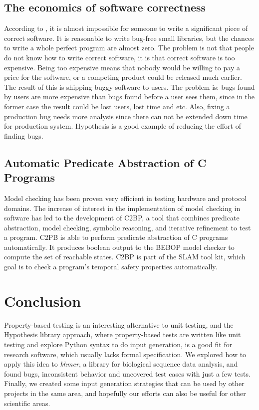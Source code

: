 \documentclass[preprint,nocopyrightspace]{sig-alternate}
\begin{document}
\subsection{The economics of software correctness}
According to \citet{maciver_economics_2015},
it is almost impossible for someone to write a significant piece of correct software.
It is reasonable to write bug-free small libraries,
but the chances to write a whole perfect program are almost zero.
The problem is not that people do not know how to write correct software,
it is that correct software is too expensive.
Being too expensive means that nobody would be willing to pay a price for the software,
or a competing product could be released much earlier.
The result of this is shipping buggy software to users.
The problem is:
bugs found by users are more expensive than bugs found before a user sees them,
since in the former case the result could be lost users, lost time and etc.
Also, fixing a production bug needs more analysis since
there can not be extended down time for production system.
Hypothesis is a good example of reducing the effort of finding bugs.

\subsection{Automatic Predicate Abstraction of C Programs}
Model checking has been proven very efficient in testing hardware and protocol domains. \citet{model_checking}
The increase of interest in the implementation of model checking in software has led to the development of C2BP,
a tool that combines predicate abstraction, model checking, symbolic reasoning, and iterative refinement to test a program.
C2PB is able to perform predicate abstraction of C programs automatically.
It produces boolean output to the BEBOP model checker to compute the set of reachable states.
C2BP is part of the SLAM tool kit, which goal is to check a program’s temporal safety properties automatically.

\section{Conclusion}

Property-based testing is an interesting alternative to unit testing,
and the Hypothesis library approach,
where property-based tests are written like unit testing and explore Python syntax to do input generation,
is a good fit for research software,
which usually lacks formal specification.
We explored how to apply this idea to \emph{khmer},
a library for biological sequence data analysis,
and found bugs,
inconsistent behavior and uncovered test cases with just a few tests.
Finally,
we created some input generation strategies that can be used by other projects in the same area,
and hopefully our efforts can also be useful for other scientific areas.



\end{document}
